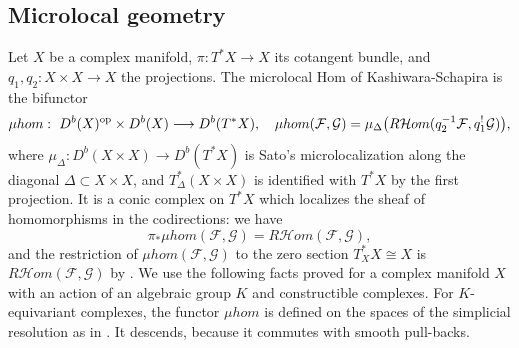 \documentclass[11pt,reqno]{amsart}
\theoremstyle{definition}
\theoremstyle{remark}
\def\muhom{\mu hom}
\begin{document}
\subsection{Microlocal geometry}\label{subsec:micro-inputs}
Let $X$ be a complex manifold, $\pi:T^*X\to X$ its cotangent bundle, and $q_1,q_2:X\times X\to X$ the projections.
The {microlocal Hom} of Kashiwara-Schapira \cite[\S4.4]{KS90} is the bifunctor
\[
\muhom:\ D^b(X)^{\rm op}\times D^b(X)\longrightarrow D^b(T^*X),\quad \muhom(\mathcal F,\mathcal G)=\mu_\Delta\big(R\mathcal Hom(q_2^{-1}\mathcal F,q_1^!\mathcal G)\big),
\]
where $\mu_\Delta:D^b(X\times X)\to D^b(T^*X)$ is Sato's microlocalization 
along the diagonal $\Delta\subset X\times X$, and $T^*_\Delta(X\times X)$ is identified with $T^*X$ by
the first projection. It is a conic complex on $T^*X$ which localizes the sheaf of homomorphisms in the codirections: we have
\[
\pi_*\muhom(\mathcal F,\mathcal G)=R\mathcal Hom(\mathcal F,\mathcal G),
\]
and the restriction of $\muhom(\mathcal F,\mathcal G)$ to the zero section $T^*_XX\cong X$ is $R\mathcal Hom(\mathcal F,\mathcal G)$ 
by \cite[Prop.~4.4.2]{KS90}. 
We use the following facts proved \cite{KS90} for a complex manifold $X$ with an action of an algebraic group $K$ and
constructible complexes. For $K$-equivariant complexes, the functor $\muhom$ is defined on the spaces of the
simplicial resolution as in \cite[\S4.4]{KS90}. It descends, because it commutes with smooth pull-backs.
\end{document}
